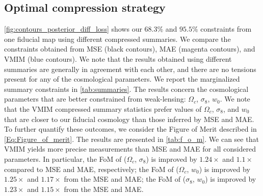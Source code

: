 \documentclass{aa}
\begin{document}
\subsection{Optimal compression strategy}
\autoref{fig:contours_posterior_diff_loss} shows our $68.3\%$ and $95.5\%$ constraints from one fiducial map using different compressed summaries.
We compare the constraints obtained from MSE (black contours), MAE (magenta contours), and VMIM (blue contours).
We note that the results obtained using different summaries are generally in agreement with each other, and there are no tensions present for any of the cosmological parameters. We report the marginalized summary constraints in \autoref{tab:summaries}. The results concern the cosmological parameters that are better constrained from weak-lensing: $\Omega_c$, $\sigma_8$, $w_0$.
We note that the VMIM compressed summary statistics prefer values of $\Omega_c$, $\sigma_8$, and $w_0$ that are closer to our fiducial cosmology than those inferred by MSE and MAE. \\
To further quantify these outcomes, we consider the Figure of Merit described in \autoref{Eq:Figure_of_merit}. 
The results are presented in \autoref{tab:f_o_m}.
We can see that VMIM yields more precise measurements than MSE and MAE for all considered parameters.
In particular, the FoM of ($\Omega_c$, $\sigma_8$) is improved by $1.24\times$ and $1.1\times$ compared to MSE and MAE, respectively;  the FoM of ($\Omega_c$, $w_0$) is improved by $1.25\times$ and $1.17\times$ from the MSE and MAE; the FoM of ($\sigma_8$, $w_0$) is improved by $1.23\times$ and $1.15\times$ from the MSE and MAE.
\end{document}
